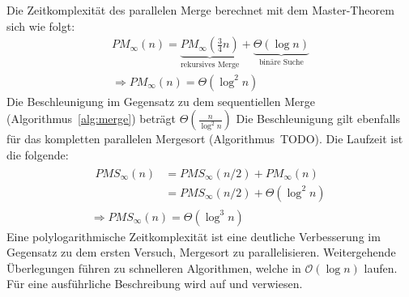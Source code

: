 Die Zeitkomplexität des parallelen Merge berechnet mit dem Master-Theorem sich
wie folgt:
\begin{equation}
    \begin{gathered}
        PM_\infty(n) =
        \underbrace{PM_\infty\left( \frac{3}{4}n \right)}_{\text{rekursives Merge}}
        + \underbrace{\Theta(\log n)}_{\text{binäre Suche}}
        \\
        \Rightarrow PM_\infty(n) = \Theta(\log^2 n)
    \end{gathered}
\end{equation}
Die Beschleunigung im Gegensatz zu dem sequentiellen Merge
(Algorithmus~\ref{alg:merge}) beträgt $\Theta(\frac{n}{\log^2 n})$
Die Beschleunigung gilt ebenfalls für das kompletten parallelen Mergesort
(Algorithmus~TODO).
Die Laufzeit ist die folgende:
\begin{equation}
    \begin{gathered}
        \begin{split}
            PMS_\infty (n) &= PMS_\infty(n/2) + PM_\infty(n) \\
            &= PMS_\infty(n/2) + \Theta(\log^2 n)
        \end{split} \\
        \Rightarrow PMS_\infty(n) = \Theta(\log^3 n)
    \end{gathered}
\end{equation}
Eine polylogarithmische Zeitkomplexität ist eine deutliche Verbesserung im
Gegensatz zu dem ersten Versuch, Mergesort zu parallelisieren.
Weitergehende Überlegungen führen zu schnelleren Algorithmen, welche in
$\mathcal{O}(\log n)$ laufen.
Für eine ausführliche Beschreibung wird auf \cite[Kapitel 10]{reif} und
\cite[S.163]{jaja} verwiesen.
